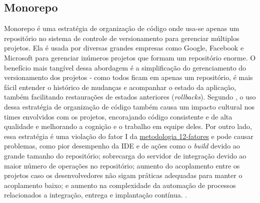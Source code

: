 \subsection{Monorepo}\label{subsecao-monorepo}
Monorepo é uma estratégia de organização de código onde usa-se apenas um repositório no sistema de controle de versionamento para gerenciar múltiplos projetos. Ela é usada por diversas grandes empresas como Google, Facebook e Microsoft para gerenciar inúmeros projetos que formam um repositório enorme. O benefício mais tangível dessa abordagem é a simplificação do gerenciamento do versionamento dos projetos - como todos ficam em apenas um repositório, é mais fácil entender o histórico de mudanças e acompanhar o estado da aplicação, também facilitando restaurações de estados anteriores (\emph{rollbacks}). Segundo , o uso dessa estratégia de organização de código também causa um impacto cultural nos times envolvidos com os projetos, encorajando código consistente e de alta qualidade e melhorando a cognição e o trabalho em equipe deles. Por outro lado, essa estratégia é uma violação do fator I da \hyperref[metodologia-12-fatores]{metodologia 12-fatores} e pode causar problemas, como pior desempenho da IDE e de ações como o \emph{build} devido ao grande tamanho do repositório; sobrecarga do servidor de integração devido ao maior número de operações no repositório; aumento do acoplamento entre os projetos caso os desenvolvedores não sigam práticas adequadas para manter o acoplamento baixo; e aumento na complexidade da automação de processos relacionados a integração, entrega e implantação contínua. \cite{monorepo-polirepo-semaphoreci, monorepo-do-or-do-not, monorepo-polirepo-nicolas}.




